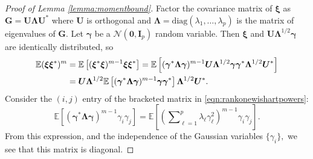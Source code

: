 \documentclass[11pt,letterpaper,twoside,reqno,nosumlimits]{amsart}
\renewcommand{\star}{*}
\newcommand{\mat}[1]{\ensuremath{\bm{#1}}} %
\renewcommand{\vec}[1]{\ensuremath{\bm{#1}}}
\newcommand{\E}{\ensuremath{\mathbb{E}}}
\theoremstyle{remark}
\numberwithin{equation}{section}
\numberwithin{thm}{section}
\numberwithin{prop}{section}
\numberwithin{defn}{section}
\numberwithin{remark}{section}
\begin{document}
\begin{proof}[Proof of Lemma \ref{lemma:momentbound}]

Factor the covariance matrix of $\vec{\xi}$ as $\mat{G} = \mat{U\Lambda U}^\star$ where $\mat{U}$ is orthogonal and $\mat{\Lambda} = \text{diag}(\lambda_1, \ldots, \lambda_p)$ is the matrix of eigenvalues of $\mat{G}$. Let $\vec{\gamma}$ be a $\mathcal{N}(\vec{0},\mathbf{I}_p)$ random variable. Then $\vec{\xi}$ and $\mat{U\Lambda}^{1/2} \vec{\gamma}$ are identically distributed, so 
\begin{align} 
\E (\vec{\xi}\vec{\xi}^\star)^m & = \E\left[(\vec{\xi}^\star\vec{\xi})^{m-1} \vec{\xi}\vec{\xi}^\star \right] = \E\left[ (\vec{\gamma}^\star \mat{\Lambda} \vec{\gamma})^{m-1} \mat{U\Lambda}^{1/2} \vec{\gamma}\vec{\gamma}^\star \mat{\Lambda}^{1/2} \mat{U}^\star \right]\notag \\
 & = \mat{U\Lambda}^{1/2} \E \left[ (\vec{\gamma}^\star \mat{\Lambda} \vec{\gamma})^{m-1} \vec{\gamma}\vec{\gamma}^\star \right] \mat{\Lambda}^{1/2}\mat{U}^\star. 
\label{eqn:rankonewishartpowers}
\end{align}
Consider the $(i,j)$ entry of the bracketed matrix in \eqref{eqn:rankonewishartpowers}:
\begin{equation}
\E\left[(\vec{\gamma}^\star \mat{\Lambda} \vec{\gamma})^{m-1} \gamma_i\gamma_j \right] = \E\left[\left(\sum\nolimits_{\ell=1}^p \lambda_\ell \gamma_\ell^2 \right)^{m-1} \gamma_i \gamma_j\right]. 
\label{eqn:gaussianchaos}
\end{equation}
From this expression, and the independence of the Gaussian variables $\{ \gamma_i \},$ we see that this matrix is diagonal.


\end{proof}
\end{document}
